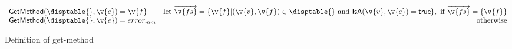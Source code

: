\begin{figure*}
$$
\begin{array}{lr}

  \getmethod {\disptable{}}
             {\v{e}}
             {\v{f}}

             & 
             \text{let } {\overrightarrow{\v{fs}}} = \{ \v{f} | (\v{v}, \v{f}) \in \disptable{} \text{ and } \isaopsem{\v{v}}{\v{e}} = \true{} \}, \text{ if } {\overrightarrow{\v{fs}}} = \{\v{f}\}

             \\
  \getmethod {\disptable{}}
             {\v{e}}
             {\mmerror{}} & \text{otherwise}

\end{array}
$$
\caption{Definition of get-method}
\end{figure*}
